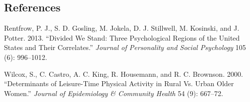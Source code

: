 \documentclass[
  letterpaper,
  DIV=11,
  numbers=noendperiod]{scrartcl}
\newlength{\cslhangindent}
\newenvironment{CSLReferences}[2] %
 {\begin{list}{}{%
  \setlength{\itemindent}{0pt}
  \setlength{\leftmargin}{0pt}
  \setlength{\parsep}{0pt}
  \ifodd #1
   \setlength{\leftmargin}{\cslhangindent}
   \setlength{\itemindent}{-1\cslhangindent}
  \fi
  \setlength{\itemsep}{#2\baselineskip}}}
 {\end{list}}
\begin{document}
\subsection*{References}\label{references}

\label{refs}
\begin{CSLReferences}{1}{0}
Rentfrow, P. J., S. D. Gosling, M. Jokela, D. J. Stillwell, M. Kosinski,
and J. Potter. 2013. {``Divided We Stand: Three Psychological Regions of
the United States and Their Correlates.''} \emph{Journal of Personality
and Social Psychology} 105 (6): 996--1012.

Wilcox, S., C. Castro, A. C. King, R. Housemann, and R. C. Brownson.
2000. {``Determinants of Leisure-Time Physical Activity in Rural Vs.
Urban Older Women.''} \emph{Journal of Epidemiology \& Community Health}
54 (9): 667--72.

\end{CSLReferences}
\end{document}

